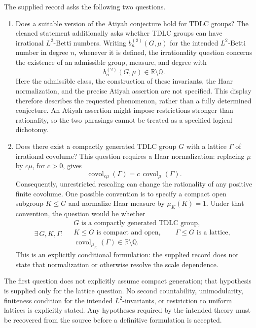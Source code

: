 \documentclass[11pt]{article}
\newcommand{\Q}{\mathbb{Q}}
\newcommand{\R}{\mathbb{R}}
\begin{document}
The supplied record asks the following two questions.
\begin{enumerate}
\item Does a suitable version of the Atiyah conjecture hold for TDLC groups? The cleaned statement additionally asks whether TDLC groups can have irrational \(L^2\)-Betti numbers. Writing \(b_n^{(2)}(G,\mu)\) for the intended \(L^2\)-Betti number in degree \(n\), whenever it is defined, the irrationality question concerns the existence of an admissible group, measure, and degree with
\[
 b_n^{(2)}(G,\mu)\in\R\setminus\Q.
\]
Here the admissible class, the construction of these invariants, the Haar normalization, and the precise Atiyah assertion are not specified. This display therefore describes the requested phenomenon, rather than a fully determined conjecture. An Atiyah assertion might impose restrictions stronger than rationality, so the two phrasings cannot be treated as a specified logical dichotomy.
\item Does there exist a compactly generated TDLC group \(G\) with a lattice \(\Gamma\) of irrational covolume? This question requires a Haar normalization: replacing \(\mu\) by \(c\mu\), for \(c>0\), gives
\[
 \operatorname{covol}_{c\mu}(\Gamma)
 =c\,\operatorname{covol}_{\mu}(\Gamma).
\]
Consequently, unrestricted rescaling can change the rationality of any positive finite covolume. One possible convention is to specify a compact open subgroup \(K\leq G\) and normalize Haar measure by \(\mu_K(K)=1\). Under that convention, the question would be whether
\[
 \exists\,G,K,\Gamma:\quad
 \begin{gathered}
 G\text{ is a compactly generated TDLC group},\\
 K\leq G\text{ is compact and open},\qquad
 \Gamma\leq G\text{ is a lattice},\\
 \operatorname{covol}_{\mu_K}(\Gamma)\in\R\setminus\Q.
 \end{gathered}
\]
This is an explicitly conditional formulation: the supplied record does not state that normalization or otherwise resolve the scale dependence.
\end{enumerate}
The first question does not explicitly assume compact generation; that hypothesis is supplied only for the lattice question. No second countability, unimodularity, finiteness condition for the intended \(L^2\)-invariants, or restriction to uniform lattices is explicitly stated. Any hypotheses required by the intended theory must be recovered from the source before a definitive formulation is accepted.
\end{document}
